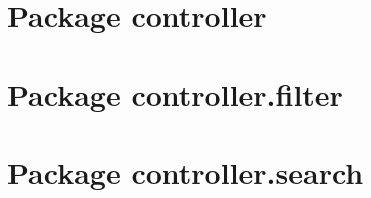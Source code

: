 \documentclass[10pt,a4paper,headinclude,footinclude,hidelinks]{scrreprt} %
\begin{document}
	\section{Package controller}
	\label{ch:stage:design:sistema:controller}

	\section{Package controller.filter}
	\label{ch:stage:design:sistema:controller.filter}

	\section{Package controller.search}
	\label{ch:stage:design:sistema:controller.search}
\end{document}
